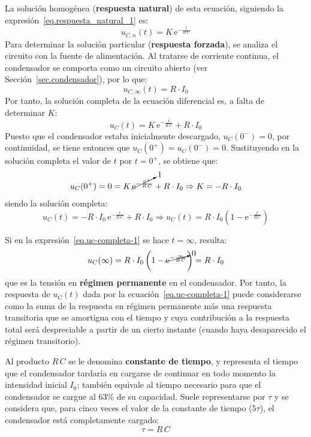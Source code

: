 La solución homogénea (\textbf{respuesta natural}) de esta ecuación,
siguiendo la expresión~\eqref{eq.respuesta_natural_1} es:
\begin{equation}
  \boxed{u_{C,n}(t)=K\,\mathrm{e}^{-\frac{t}{R\,C}}}
\end{equation}
Para determinar la solución particular (\textbf{respuesta forzada}),
se analiza el circuito con la fuente de alimentación. Al tratarse de
corriente continua, el condensador se comporta como un circuito
abierto (ver Sección~\ref{sec.condensador}), por lo que:
\begin{equation}
  \boxed{u_{C,\infty}(t)=R\cdot I_0}
\end{equation}
Por tanto, la solución completa de la ecuación diferencial es, a falta
de determinar $K$:
\begin{equation*}{u_C(t)=K\,\mathrm{e}^{-\frac{t}{R\,C}}+R\cdot I_0}
\end{equation*}
Puesto que el condensador estaba inicialmente descargado,
$u_C(0^-)=0$, por continuidad, se tiene entonces que
$u_C(0^+)=u_C(0^-)=0$. Sustituyendo en la solución completa el valor
de $t$ por $t=0^+$, se obtiene que:
\begin{equation*}
  u_C(0^+)=0=K\,\cancelto{1}{\mathrm{e}^{-\frac{0^+}{R\,C}}}+R\cdot I_0\Rightarrow K=-R\cdot I_0
\end{equation*}
siendo la solución completa:
\begin{equation}\label{eq.uc-completa-1}
  u_C(t)=-R\cdot I_0\,\mathrm{e}^{-\frac{t}{R\,C}}+R\cdot I_0\Rightarrow \boxed{u_C(t) =R\cdot I_0\left(1- \mathrm{e}^{-\frac{t}{R\,C}}\right)}
\end{equation}
	
Si en la expresión~\eqref{eq.uc-completa-1} se hace $t=\infty$,
resulta:
\begin{equation*}
  u_C(\infty)=R\cdot I_0\left(1- \cancelto{0}{\mathrm{e}^{-\frac{\infty}{R\,C}}}\right)=R\cdot I_0
\end{equation*}
que es la tensión en \textbf{régimen permanente} en el
condensador. Por tanto, la respuesta de $u_C(t)$ dada por la
ecuación~\eqref{eq.uc-completa-1} puede considerarse como la suma de
la respuesta en régimen permanente más una respuesta transitoria que
se amortigua con el tiempo y cuya contribución a la respuesta total
será despreciable a partir de un cierto instante (cuando haya
desaparecido el régimen transitorio).
	
Al producto $R\,C$ se le denomina \textbf{constante de tiempo}, y
representa el tiempo que el condensador tardaría en cargarse de
continuar en todo momento la intensidad inicial $I_0$; también
equivale al tiempo necesario para que el condensador se cargue al 63\%
de su capacidad. Suele representarse por $\tau$ y se considera que,
para cinco veces el valor de la constante de tiempo ($5\tau$), el
condensador está completamente cargado:
\begin{equation}
  \boxed{\tau=R\,C}
\end{equation}


